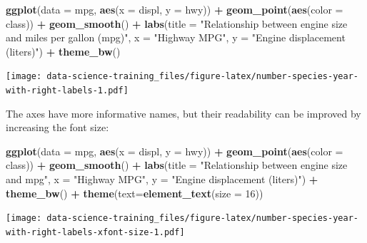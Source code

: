 \documentclass[]{book}
\newenvironment{Shaded}{\begin{snugshade}}{\end{snugshade}}
\newcommand{\KeywordTok}[1]{\textcolor[rgb]{0.13,0.29,0.53}{\textbf{#1}}}
\newcommand{\DataTypeTok}[1]{\textcolor[rgb]{0.13,0.29,0.53}{#1}}
\newcommand{\DecValTok}[1]{\textcolor[rgb]{0.00,0.00,0.81}{#1}}
\newcommand{\StringTok}[1]{\textcolor[rgb]{0.31,0.60,0.02}{#1}}
\newcommand{\OperatorTok}[1]{\textcolor[rgb]{0.81,0.36,0.00}{\textbf{#1}}}
\newcommand{\NormalTok}[1]{#1}
\theoremstyle{definition}
\theoremstyle{definition}
\theoremstyle{definition}
\theoremstyle{remark}
\begin{document}
\begin{Shaded}
\begin{Highlighting}[]
\KeywordTok{ggplot}\NormalTok{(}\DataTypeTok{data =}\NormalTok{ mpg, }\KeywordTok{aes}\NormalTok{(}\DataTypeTok{x =}\NormalTok{ displ, }\DataTypeTok{y =}\NormalTok{ hwy)) }\OperatorTok{+}\StringTok{ }
\StringTok{  }\KeywordTok{geom_point}\NormalTok{(}\KeywordTok{aes}\NormalTok{(}\DataTypeTok{color =}\NormalTok{ class)) }\OperatorTok{+}\StringTok{ }
\StringTok{  }\KeywordTok{geom_smooth}\NormalTok{() }\OperatorTok{+}
\StringTok{  }\KeywordTok{labs}\NormalTok{(}\DataTypeTok{title =} \StringTok{"Relationship between engine size and miles per gallon (mpg)"}\NormalTok{,}
         \DataTypeTok{x =} \StringTok{"Highway MPG"}\NormalTok{,}
         \DataTypeTok{y =} \StringTok{"Engine displacement (liters)"}\NormalTok{) }\OperatorTok{+}
\StringTok{  }\KeywordTok{theme_bw}\NormalTok{()}
\end{Highlighting}
\end{Shaded}

\texttt{[image: data-science-training\_files/figure-latex/number-species-year-with-right-labels-1.pdf]}

The axes have more informative names, but their readability can be
improved by increasing the font size:

\begin{Shaded}
\begin{Highlighting}[]
\KeywordTok{ggplot}\NormalTok{(}\DataTypeTok{data =}\NormalTok{ mpg, }\KeywordTok{aes}\NormalTok{(}\DataTypeTok{x =}\NormalTok{ displ, }\DataTypeTok{y =}\NormalTok{ hwy)) }\OperatorTok{+}\StringTok{ }
\StringTok{  }\KeywordTok{geom_point}\NormalTok{(}\KeywordTok{aes}\NormalTok{(}\DataTypeTok{color =}\NormalTok{ class)) }\OperatorTok{+}\StringTok{ }
\StringTok{  }\KeywordTok{geom_smooth}\NormalTok{() }\OperatorTok{+}
\StringTok{  }\KeywordTok{labs}\NormalTok{(}\DataTypeTok{title =} \StringTok{"Relationship between engine size and mpg"}\NormalTok{,}
         \DataTypeTok{x =} \StringTok{"Highway MPG"}\NormalTok{,}
         \DataTypeTok{y =} \StringTok{"Engine displacement (liters)"}\NormalTok{) }\OperatorTok{+}
\StringTok{  }\KeywordTok{theme_bw}\NormalTok{() }\OperatorTok{+}
\StringTok{  }\KeywordTok{theme}\NormalTok{(}\DataTypeTok{text=}\KeywordTok{element_text}\NormalTok{(}\DataTypeTok{size =} \DecValTok{16}\NormalTok{))}
\end{Highlighting}
\end{Shaded}

\texttt{[image: data-science-training\_files/figure-latex/number-species-year-with-right-labels-xfont-size-1.pdf]}
\end{document}
